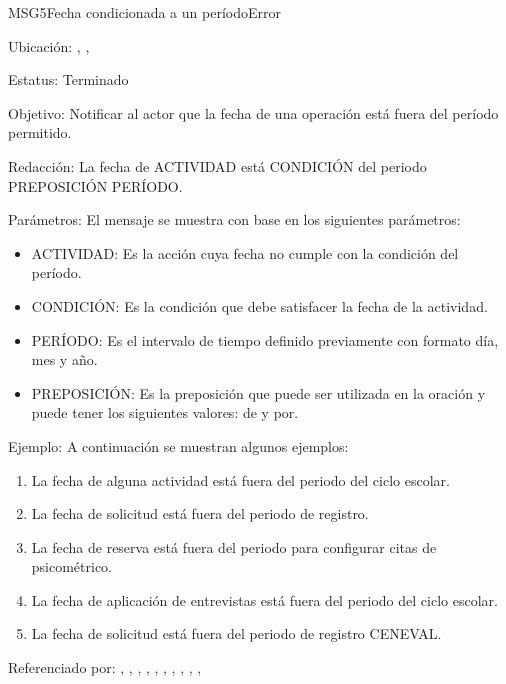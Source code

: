 \begin{mensaje}{MSG5}{Fecha condicionada a un período}{Error}
	\item[Ubicación:] \msjEmergente, \msjCampo, \msjSuperior
	\item[Estatus:] Terminado
	\item[Objetivo:] Notificar al actor que la fecha de una operación está fuera del período permitido.
	\item[Redacción:] La fecha de ACTIVIDAD está CONDICIÓN del periodo PREPOSICIÓN PERÍODO.
	\item[Parámetros:] El mensaje se muestra con base en los siguientes parámetros:
	\begin{itemize}
		\item ACTIVIDAD: Es la acción cuya fecha no cumple con la condición del período.
		\item CONDICIÓN: Es la condición que debe satisfacer la fecha de la actividad.
		\item PERÍODO: Es el intervalo de tiempo definido previamente con formato día, mes y año.
		\item PREPOSICIÓN: Es la preposición que puede ser utilizada en la oración y puede tener los siguientes valores: de y por.
	\end{itemize}
	\item[Ejemplo:] A continuación se muestran algunos ejemplos: 
	\begin{enumerate}
		\item La fecha de alguna actividad está fuera del periodo del ciclo escolar.
		\item La fecha de solicitud está fuera del periodo de registro.
		\item La fecha de reserva está fuera del periodo para configurar citas de psicométrico.
		\item La fecha de aplicación de entrevistas está fuera del periodo del ciclo escolar.
		\item La fecha de solicitud está fuera del periodo de registro CENEVAL.
	
\end{enumerate}
	
	\item[Referenciado por:] 
	, ,
	, 
	, 
	,
	,
	,
	,
	,
	,
\end{mensaje}

